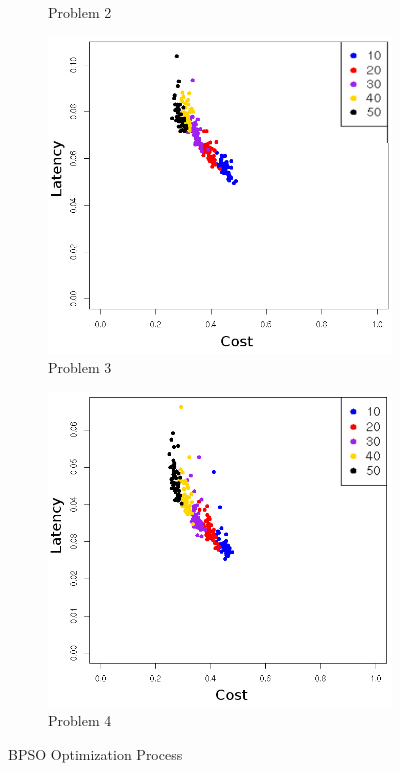 \begin{figure}[!h]
\begin{subfigure}{0.4\textwidth}
	   \caption{Problem 2}
   \end{subfigure}
   \begin{subfigure}{0.4\textwidth}
       \includegraphics[width=\textwidth]{pics/binaryevolve3.png}
	   \caption{Problem 3}
   \end{subfigure}
   \begin{subfigure}{0.4\textwidth}
       \includegraphics[width=\textwidth]{pics/binaryevolve4.png}
	   \caption{Problem 4}
   \end{subfigure}

   \caption{BPSO Optimization Process}
   \label{fig:bpso_evolve}
\end{figure}



